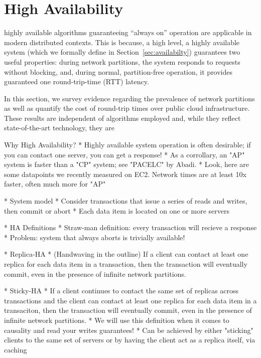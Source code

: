 
\section{High Availability}
\label{sec:availability}




highly available algorithms guaranteeing
``always on'' operation are applicable in modern distributed
contexts. This is because, a high level, a highly available system
(which we formally define in Section~\ref{sec:availabilty}) guarantees
two useful properties: during network partitions, the system responds
to requests without blocking, and, during normal, partition-free
operation, it provides guaranteed one round-trip-time (RTT) latency.

In this section, we survey evidence regarding the prevalence of
network partitions as well as quantify the cost of round-trip times
over public cloud infrastructure. These results are independent of
algorithms employed and, while they reflect state-of-the-art
technology, they are



Why High Availability?
* Highly available system operation is often desirable; if you can contact one server, you can get a response!
* As a corrollary, an "AP" system is faster than a "CP" system; see "PACELC" by Abadi.
	* Look, here are some datapoints we recently measured on EC2. Network times are at least 10x faster, often much more for "AP"


* System model
	* Consider transactions that issue a series of reads and writes, then commit or abort
	* Each data item is located on one or more servers

* HA Definitions
	* Straw-man definition: every transaction will recieve a response
		* Problem: system that always aborts is trivially available!

* Replica-HA
	* (Handwaving in the outline) If a client can contact at least one replica for each data item in a transaction, then the transaction will eventually commit, even in the presence of infinite network partitions.

* Sticky-HA
	* If a client continues to contact the same set of replicas across transactions and the client can contact at least one replica for each data item in a transaciton, then the transaction will eventually commit, even in the presence of infinite network partitions.
	* We will use this definition when it comes to causality and read your writes guarantees!
	* Can be achieved by either "sticking" clients to the same set of servers or by having the client act as a replica itself, via caching 




